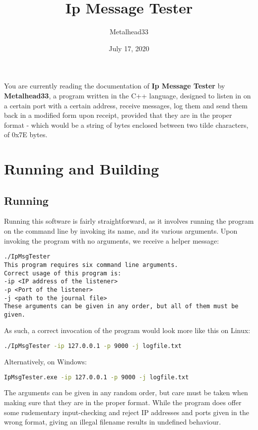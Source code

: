 \documentclass[openany,10pt,a4paper]{book}
\title{Ip Message Tester}
\author{Metalhead33}
\date{July 17, 2020}
\begin{document}
\maketitle
You are currently reading the documentation of \textbf{Ip Message Tester} by \textbf{Metalhead33}, a program written in the C++ language, designed to listen in on a certain port with a certain address, receive messages, log them and send them back in a modified form upon receipt, provided that they are in the proper format - which would be a string of bytes enclosed between two tilde characters, of 0x7E bytes.
\tableofcontents
\section{Running and Building}
\subsection{Running}
Running this software is fairly straightforward, as it involves running the program on the command line by invoking its name, and its various arguments. Upon invoking the program with no arguments, we receive a helper message:

\begin{lstlisting}
./IpMsgTester
This program requires six command line arguments.
Correct usage of this program is:
-ip <IP address of the listener>
-p <Port of the listener>
-j <path to the journal file>
These arguments can be given in any order, but all of them must be given.
\end{lstlisting}

As such, a correct invocation of the program would look more like this on Linux:

\begin{lstlisting}[language=bash]
./IpMsgTester -ip 127.0.0.1 -p 9000 -j logfile.txt
\end{lstlisting}

Alternatively, on Windows:

\begin{lstlisting}[language=bash]
IpMsgTester.exe -ip 127.0.0.1 -p 9000 -j logfile.txt
\end{lstlisting}

The arguments can be given in any random order, but care must be taken when making sure that they are in the proper format. While the program does offer some rudementary input-checking and reject IP addresses and ports given in the wrong format, giving an illegal filename results in undefined behaviour.
\end{document}
